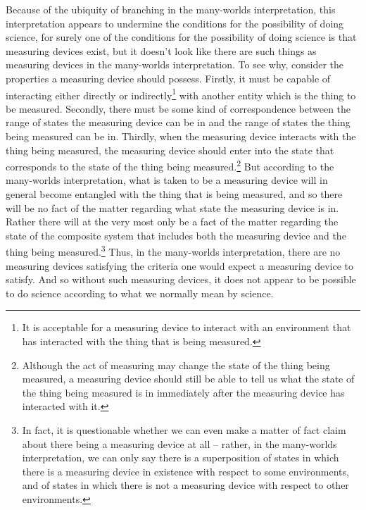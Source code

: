 \documentclass[12pt]{report}
\begin{document}
      Because of the ubiquity of branching in the many-worlds interpretation, this interpretation appears to undermine the conditions for the possibility of doing science, for surely one of the conditions for the possibility of doing science is that measuring devices exist, but it doesn't look like there are such things as measuring devices in the many-worlds interpretation. To see why, consider the properties a measuring device should possess. Firstly, it must be capable of interacting either directly or indirectly\footnote{It is acceptable for a measuring device to interact with an environment that has interacted with the thing that is being measured.} with another entity which is the thing to be measured. Secondly, there must be some kind of correspondence between the range of states the measuring device can be in and the range of states the thing being measured can be in. Thirdly, when the measuring device interacts with the thing being measured, the measuring device should enter into the state that corresponds to the state of the thing being measured.\footnote{Although the act of measuring may change the state of the thing being measured, a measuring device should still be able to tell us what the state of the thing being measured is in immediately after the measuring device has interacted with it.} But according to the many-worlds interpretation, what is taken to be a measuring device will  in general become entangled with the thing  that is being measured,  and so there will be no fact of the matter regarding what state the measuring device is in. Rather there will at the very most only be a fact of the matter regarding the state of the composite system that includes both the measuring device and the thing being measured.\footnote{In fact, it is questionable whether we can even make a matter of fact claim about there being a measuring device at all -- rather, in the many-worlds interpretation, we can only say there is a superposition of states in which there is a measuring device in existence with respect to some environments, and of states in which there is not a measuring device with respect to other environments.  } Thus, in the many-worlds interpretation, there are no measuring devices satisfying the criteria one would expect a measuring device to satisfy. And so without such measuring devices, it does not appear to be possible to do science according to what we normally mean by science.  
\end{document}
